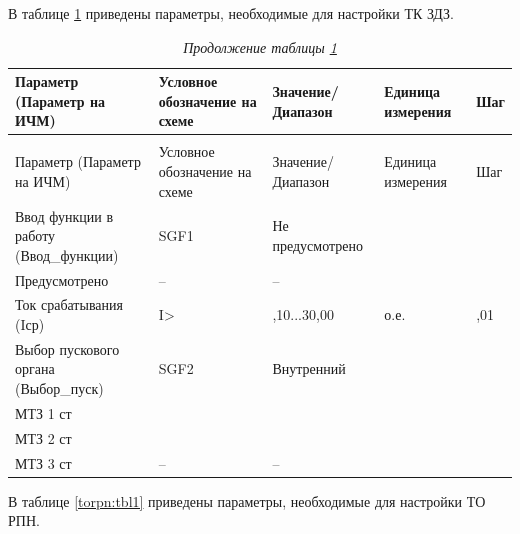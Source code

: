 В таблице \ref{tkzdz:tbl1} приведены параметры, необходимые для настройки ТК ЗДЗ.

\footnotesize
\begin{longtable}{|>{\centering\arraybackslash}m{5.3cm}|>{\centering\arraybackslash}m{3.3cm}|>{\centering\arraybackslash}m{4.2cm}|>{\centering\arraybackslash}m{1.8cm}|>{\centering\arraybackslash}m{1cm}|}
\caption{Параметры для настройки ТК ЗДЗ\hfill\vspace{-0.5\baselineskip}}\label{tkzdz:tbl1}\\ 
\hline
\rowcolor{gray!20}
Параметр (Параметр на ИЧМ) & Условное обозначение на схеме & Значение/ Диапазон & Единица измерения & Шаг \\ 
\hline
\endfirsthead
\caption*{\hspace{3pt}\emph{Продолжение таблицы \ref{tkzdz:tbl1}\hfill\vspace{-0.5\baselineskip}}} \\ %
\hline
\rowcolor{gray!20}
Параметр (Параметр на ИЧМ) & Условное обозначение на схеме & Значение/ Диапазон & Единица измерения & Шаг \\ 
\endhead
\endfoot
\endlastfoot
\centering Ввод функции в работу (Ввод\_функции)  & \centering SGF1 & \centering Не предусмотрено \\ Предусмотрено & \centering -- & \centering \arraybackslash -- \\
\hline
\centering Ток срабатывания (Iср)  & \centering I> & \centering 0,10...30,00 & \centering о.е. & \centering \arraybackslash 0,01 \\
\hline
\centering Выбор пускового органа (Выбор\_пуск)  & \centering SGF2 & \centering Внутренний \\ МТЗ 1 ст \\ МТЗ 2 ст \\ МТЗ 3 ст & \centering -- & \centering \arraybackslash -- \\
\hline
\end{longtable}
\normalsize


\par
В таблице \ref{torpn:tbl1} приведены параметры, необходимые для настройки ТО РПН.

